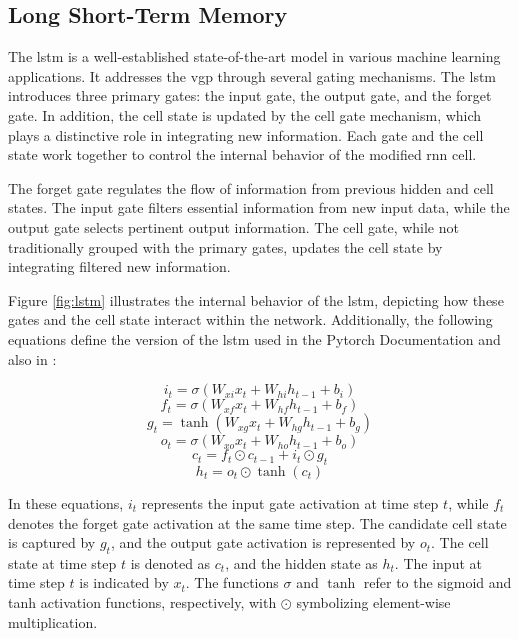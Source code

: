 \subsection{Long Short-Term Memory}
\label{sect:lstm}
The \gls{lstm} is a well-established state-of-the-art model in various machine learning applications. It addresses the \gls{vgp} through several gating mechanisms. The \gls{lstm} introduces three primary gates: the input gate, the output gate, and the forget gate. In addition, the cell state is updated by the cell gate mechanism, which plays a distinctive role in integrating new information. Each gate and the cell state work together to control the internal behavior of the modified \gls{rnn} cell. 

The forget gate regulates the flow of information from previous hidden and cell states. The input gate filters essential information from new input data, while the output gate selects pertinent output information. The cell gate, while not traditionally grouped with the primary gates, updates the cell state by integrating filtered new information.

Figure \ref{fig:lstm} illustrates the internal behavior of the \gls{lstm}, depicting how these gates and the cell state interact within the network. Additionally, the following equations define the version of the \gls{lstm} used in the Pytorch Documentation \cite{lstm-pytorch2} and also in :

\begin{equation}
    i_t = \sigma(W_{xi} x_t + W_{hi} h_{t-1} + b_{i})
\end{equation}
\begin{equation}
    f_t = \sigma(W_{xf} x_t + W_{hf} h_{t-1} + b_{f})
\end{equation}
\begin{equation}
    g_t = \tanh(W_{xg} x_t + W_{hg} h_{t-1} + b_{g})
\end{equation}
\begin{equation}
    o_t = \sigma(W_{xo} x_t + W_{ho} h_{t-1} + b_{o})
\end{equation}
\begin{equation}
    c_t = f_t \odot c_{t-1} + i_t \odot g_t
\end{equation}
\begin{equation}
    h_t = o_t \odot \tanh(c_t)
\end{equation}

In these equations, \(i_t\) represents the input gate activation at time step \(t\), while \(f_t\) denotes the forget gate activation at the same time step. The candidate cell state is captured by \(g_t\), and the output gate activation is represented by \(o_t\). The cell state at time step \(t\) is denoted as \(c_t\), and the hidden state as \(h_t\). The input at time step \(t\) is indicated by \(x_t\). The functions \(\sigma\) and \(\tanh\) refer to the sigmoid and \gls{tanh} activation functions, respectively, with \(\odot\) symbolizing element-wise multiplication.

